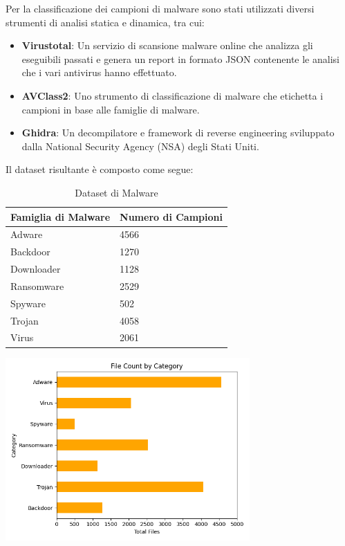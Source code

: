 Per la classificazione dei campioni di malware sono stati utilizzati diversi strumenti di analisi statica e dinamica, tra cui:
\begin{itemize}
    \item \textbf{Virustotal}: Un servizio di scansione malware online che analizza gli eseguibili passati e genera un report in formato JSON contenente le analisi che i vari antivirus hanno effettuato.
    \item \textbf{AVClass2}: Uno strumento di classificazione di malware che etichetta i campioni in base alle famiglie di malware.
    \item \textbf{Ghidra}: Un decompilatore e framework di reverse engineering sviluppato dalla National Security Agency (NSA) degli Stati Uniti.
\end{itemize}

\vspace{.5cm}
Il dataset risultante è composto come segue:

\begin{table}[h]
    \centering
    \begin{tabular}{|l|l|}
        \hline
        \textbf{Famiglia di Malware} & \textbf{Numero di Campioni} \\
        \hline
        Adware & 4566 \\
        Backdoor & 1270 \\
        Downloader & 1128 \\
        Ransomware & 2529 \\
        Spyware & 502 \\
        Trojan & 4058 \\
        Virus & 2061 \\
        \hline
    \end{tabular}
    \caption{Dataset di Malware}
\end{table}


\begin{center}
	\includegraphics[width=0.7\textwidth]{images/total_families.png}
\end{center}

